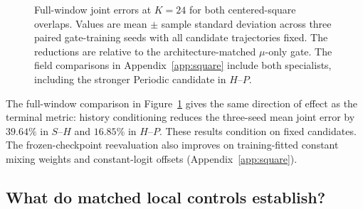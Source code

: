 \documentclass{article}
\begin{document}
\par




\begin{figure}[H]
\centering

\caption{Full-window joint errors at $K=24$ for both centered-square
overlaps. Values are mean $\pm$ sample standard deviation across three
paired gate-training seeds with all candidate trajectories fixed.
The reductions are relative to the architecture-matched $\mu$-only gate.
The field comparisons in Appendix~\ref{app:square} include both
specialists, including the stronger Periodic candidate in $H$--$P$.}
\label{fig:square_overlap}
\end{figure}



The full-window comparison in Figure~\ref{fig:square_overlap} gives the
same direction of effect as the terminal metric: history conditioning
reduces the three-seed mean joint error by $39.64\%$ in $S$--$H$ and
$16.85\%$ in $H$--$P$. These results condition on fixed candidates.
The frozen-checkpoint reevaluation also improves on training-fitted
constant mixing weights and constant-logit offsets
(Appendix~\ref{app:square}).

\subsection{What do matched local controls establish?}
\end{document}
